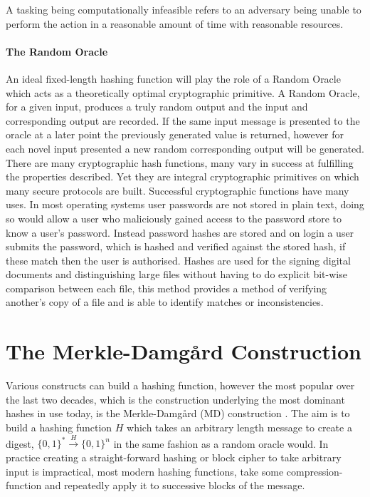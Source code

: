 \documentclass[a4paper,12pt]{article}
\begin{document}
A tasking being computationally infeasible refers to an adversary being unable to perform the action in a reasonable amount of time with reasonable resources.


\paragraph{The Random Oracle} An ideal fixed-length hashing function will play the role of a Random Oracle which  acts as a theoretically optimal cryptographic primitive. A Random Oracle, for a given input, produces a truly random output and the input and corresponding output are recorded. If the same input message is presented to the oracle at a later point the previously generated value is returned, however for each novel input presented a new random corresponding output will be generated.\\



There are many cryptographic hash functions, many vary in success at fulfilling the properties described. Yet they are integral cryptographic primitives on which many secure protocols are built. Successful cryptographic functions have many uses. In most operating systems user passwords are not stored in plain text, doing so would allow a user who maliciously gained access to the password store to know a user's password. Instead password hashes are stored and on login a user submits the password, which is hashed and verified against the stored hash, if these match then the user is authorised. Hashes are used for the signing digital documents and distinguishing large files without having to do explicit bit-wise comparison between each file, this method provides a method of verifying another's copy of a file and is able to identify matches or inconsistencies.

\section{The Merkle-Damg\r{a}rd Construction}
Various constructs can build a hashing function, however the most popular over the last two decades, which is the construction underlying the most dominant hashes in use today, is the Merkle-Damg\r{a}rd (MD) construction \cite{Merkle1979}.
The aim is to build a hashing function $H$ which takes an arbitrary length message to create a digest, $\{0,1\}^* \xrightarrow{H} \{0,1\}^n$ in the same fashion as a random oracle would. In practice creating a straight-forward hashing or block cipher to take arbitrary input is impractical, most modern hashing functions, take some compression-function and repeatedly apply it to successive blocks of the message.
\end{document}
